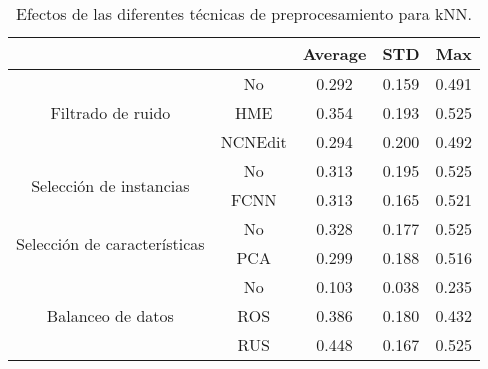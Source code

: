 \begin{table}
    \centering
    \begin{tabular}{cc|c|c|c|}
    \cline{3-5}
    \multicolumn{1}{l}{\textbf{}} & \textbf{} & \multicolumn{1}{c|}{\textbf{Average}} & \multicolumn{1}{c|}{\textbf{STD}} & \textbf{Max} \\ \hline
    \multicolumn{1}{|c|}{\multirow{3}{*}{Filtrado de ruido}}       & No        & 0.292  & 0.159
    & 0.491    \\ \cline{2-5} 
    \multicolumn{1}{|c|}{}  & HME       & 0.354   & 0.193
    & 0.525        \\ \cline{2-5} 
    \multicolumn{1}{|c|}{}  & NCNEdit   & 0.294  & 0.200
    & 0.492        \\ \hline
    \multicolumn{1}{|c|}{\multirow{2}{*}{Selección de instancias}} & No        & 0.313    &  0.195
    & 0.525        \\ \cline{2-5} 
    \multicolumn{1}{|c|}{}  & FCNN      & 0.313   &  0.165
    & 0.521        \\ \hline
    \multicolumn{1}{|c|}{\multirow{2}{*}{Selección de características}} & No        & 0.328    & 0.177
    & 0.525        \\ \cline{2-5} 
    \multicolumn{1}{|c|}{}  & PCA      & 0.299   & 0.188
    & 0.516        \\ \hline
    \multicolumn{1}{|c|}{\multirow{3}{*}{Balanceo de datos}}       & No        & 0.103     &  0.038
    & 0.235        \\ \cline{2-5} 
    \multicolumn{1}{|c|}{}  & ROS       & 0.386  & 0.180
    & 0.432        \\ \cline{2-5} 
    \multicolumn{1}{|c|}{}  & RUS       & 0.448  & 0.167
    & 0.525        \\ \hline
    \end{tabular}
    \caption{Efectos de las diferentes técnicas de preprocesamiento para kNN.}
    \label{knn}
\end{table}